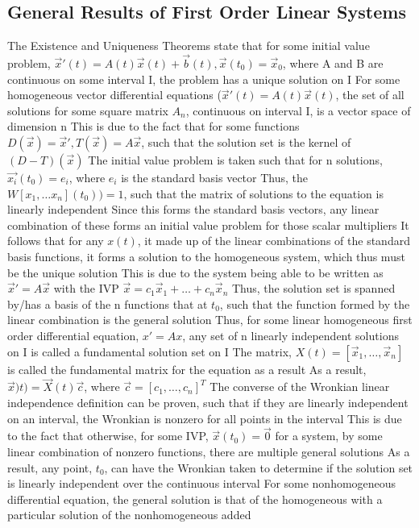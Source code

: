 \documentclass[11 pt, twoside]{article}
\newenvironment{outline*}
{
	\begin{outline}[enumerate]
	}
	{\end{outline}
}
\begin{document}
\subsection{General Results of First Order Linear Systems}
\begin{outline*}
\1 The Existence and Uniqueness Theorems state that for some initial value problem, $\vec{x}'(t) = A(t)\vec{x}(t) + \vec{b}(t), \vec{x}(t_0) = \vec{x}_0$, where A and B are continuous on some interval I, the problem has a unique solution on I
\1 For some homogeneous vector differential equations ($\vec{x}'(t) = A(t)\vec{x}(t)$, the set of all solutions for some square matrix $A_n$, continuous on interval I, is a vector space of dimension n
\2 This is due to the fact that for some functions $D(\vec{x}) = \vec{x}', T(\vec{x}) = A\vec{x}$, such that the solution set is the kernel of $(D - T)(\vec{x})$
\2 The initial value problem is taken such that for n solutions, $\vec{x_i}(t_0) = e_i$, where $e_i$ is the standard basis vector
\3 Thus, the $W[x_1, \dots x_n](t_0)) = 1$, such that the matrix of solutions to the equation is linearly independent
\3 Since this forms the standard basis vectors, any linear combination of these forms an initial value problem for those scalar multipliers
\2 It follows that for any $x(t)$, it made up of the linear combinations of the standard basis functions, it forms a solution to the homogeneous system, which thus must be the unique solution
\3 This is due to the system being able to be written as $\vec{x}' = A\vec{x}$ with the IVP $\vec{x} = c_1\vec{x}_1 + \dots + c_n\vec{x}_n$
\3 Thus, the solution set is spanned by/has a basis of the n functions that at $t_0$, such that the function formed by the linear combination is the general solution
\1 Thus, for some linear homogeneous first order differential equation, $x' = Ax$, any set of n linearly independent solutions on I is called a fundamental solution set on I
\2 The matrix, $X(t) = [\vec{x}_1, \dots, \vec{x}_n]$ is called the fundamental matrix for the equation as a result
\2 As a result, $\vec{x})t) = \vec{X}(t)\vec{c}$, where $\vec{c} = [c_1, \dots, c_n]^T$
\1 The converse of the Wronkian linear independence definition can be proven, such that if they are linearly independent on an interval, the Wronkian is nonzero for all points in the interval
\2 This is due to the fact that otherwise, for some IVP, $\vec{x}(t_0) = \vec{0}$ for a system, by some linear combination of nonzero functions, there are multiple general solutions
\2 As a result, any point, $t_0$, can have the Wronkian taken to determine if the solution set is linearly independent over the continuous interval
\1 For some nonhomogeneous differential equation, the general solution is that of the homogeneous with a particular solution of the nonhomogeneous added
\end{outline*}
\end{document}
